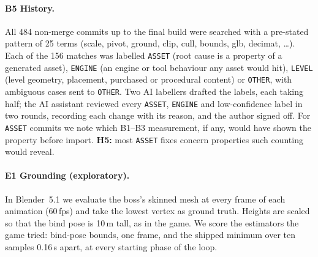 \paragraph{B5 History.} All 484 non-merge commits up to the final build were
searched with a pre-stated pattern of 25 terms (scale, pivot, ground, clip, cull,
bounds, glb, decimat, \ldots). Each of the 156 matches was labelled
\texttt{ASSET} (root cause is a property of a generated asset),
\texttt{ENGINE} (an engine or tool behaviour any asset would hit),
\texttt{LEVEL} (level geometry, placement, purchased or procedural content) or
\texttt{OTHER}, with ambiguous cases sent to \texttt{OTHER}. Two AI labellers
drafted the labels, each taking half; the AI assistant reviewed every
\texttt{ASSET}, \texttt{ENGINE} and low-confidence label in two rounds, recording
each change with its reason, and the author signed off. For \texttt{ASSET}
commits we note which B1--B3 measurement, if any, would have shown the property
before import. \textbf{H5:} most \texttt{ASSET} fixes concern properties such
counting would reveal.

\paragraph{E1 Grounding (exploratory).} In Blender~5.1 we evaluate the boss's
skinned mesh at every frame of each animation (60\,fps) and take the lowest vertex
as ground truth. Heights are scaled so that the bind pose is 10\,m tall, as in the
game. We score the estimators the game tried: bind-pose bounds, one frame, and
the shipped minimum over ten samples 0.16\,s apart, at every starting phase of
the loop.

